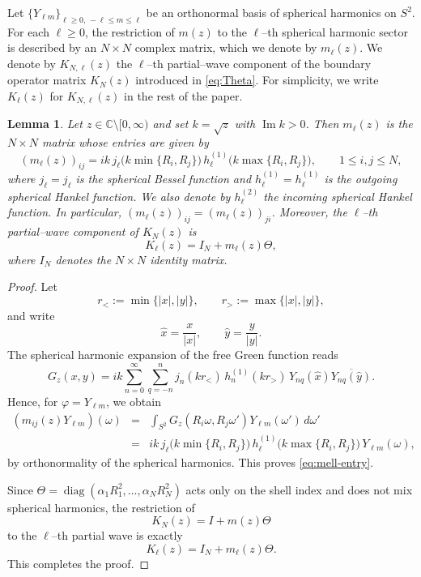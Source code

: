 \documentclass[a4paper,11pt]{article}
\numberwithin{equation}{section}
\newcommand{\C}{\mathbb{C}}
\newcommand{\diag}{\operatorname{diag}}
\newcommand{\jj}[1]{j_{#1}}
\newcommand{\hj}[1]{h^{(1)}_{#1}}
\renewcommand{\Im}{\operatorname{Im}}
\newtheorem{lem}[thm]{Lemma}
\theoremstyle{definition}
\theoremstyle{remark}
\begin{document}
Let $\{Y_{\ell m}\}_{\ell\ge0,\,-\ell\le m\le\ell}$ be an orthonormal basis
of spherical harmonics on $S^2$. For each $\ell\ge0$, the restriction of
$m(z)$ to the $\ell$--th spherical harmonic sector is described by an
$N\times N$ complex matrix, which we denote by $m_\ell(z)$. We denote by
$K_{N,\ell}(z)$ the $\ell$--th partial--wave component of the boundary
operator matrix $K_N(z)$ introduced in \eqref{eq:Theta}. For simplicity, we
write $K_\ell(z)$ for $K_{N,\ell}(z)$ in the rest of the paper.

\begin{lem}\label{lem:mell}
Let $z\in\C\setminus[0,\infty)$ and set $k=\sqrt{z}$ with $\Im k>0$.
Then $m_\ell(z)$ is the $N\times N$ matrix whose entries are given by
\begin{equation}\label{eq:mell-entry}
(m_\ell(z))_{ij}
=
ik\,\jj{\ell}\!\bigl(k\min\{R_i,R_j\}\bigr)\,
\hj{\ell}\!\bigl(k\max\{R_i,R_j\}\bigr),
\qquad 1\le i,j\le N,
\end{equation}
where $\jj{\ell}=j_\ell$ is the spherical Bessel function and
$\hj{\ell}=h_\ell^{(1)}$ is the outgoing spherical Hankel function.
We also denote by $h_\ell^{(2)}$ the incoming spherical Hankel function.
In particular, $(m_\ell(z))_{ij}=(m_\ell(z))_{ji}$.
Moreover, the $\ell$--th partial--wave component of $K_N(z)$ is
\begin{equation}\label{eq:Kell}
K_\ell(z)=I_N+m_\ell(z)\Theta,
\end{equation}
where $I_N$ denotes the $N\times N$ identity matrix.
\end{lem}

\begin{proof}
Let
$$
r_<:=\min\{|x|,|y|\},
\qquad
r_>:=\max\{|x|,|y|\},
$$
and write
$$
\widehat x=\frac{x}{|x|},
\qquad
\widehat y=\frac{y}{|y|}.
$$
The spherical harmonic expansion of the free Green function reads
$$
G_z(x,y)
=
ik\sum_{n=0}^\infty\sum_{q=-n}^n
j_n(kr_<)\,h_n^{(1)}(kr_>)\,
Y_{nq}(\widehat x)\overline{Y_{nq}(\widehat y)}.
$$
Hence, for $\varphi=Y_{\ell m}$, we obtain
\begin{eqnarray*}
(m_{ij}(z)Y_{\ell m})(\omega)
&=&
\int_{S^2}G_z(R_i\omega,R_j\omega')Y_{\ell m}(\omega')\,d\omega'
\\
&=&
ik\,j_\ell\!\bigl(k\min\{R_i,R_j\}\bigr)\,
h_\ell^{(1)}\!\bigl(k\max\{R_i,R_j\}\bigr)\,
Y_{\ell m}(\omega),
\end{eqnarray*}
by orthonormality of the spherical harmonics. This proves
\eqref{eq:mell-entry}.

Since $\Theta=\diag(\alpha_1R_1^2,\ldots,\alpha_NR_N^2)$ acts only on the
shell index and does not mix spherical harmonics, the restriction of
$$
K_N(z)=I+m(z)\Theta
$$
to the $\ell$--th partial wave is exactly
$$
K_\ell(z)=I_N+m_\ell(z)\Theta.
$$
This completes the proof.
\end{proof}
\end{document}
